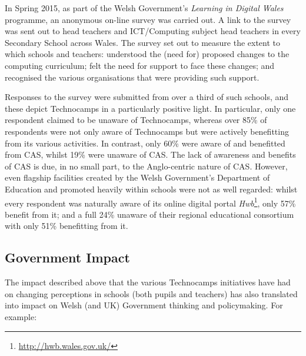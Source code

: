 \documentclass{llncs}
\begin{document}
In Spring 2015, as part of the Welsh Government's
\emph{Learning in Digital Wales} programme,
an anonymous on-line survey was carried out.
A link to the survey %
was sent out to head teachers and ICT/Computing subject head teachers
in every Secondary School across Wales.
The survey set out to measure the extent to which schools and teachers:
understood the (need for) proposed changes to the computing curriculum;
felt the need for support to face these changes;
and recognised the various organisations that were
providing such support.

Responses to the survey were submitted from over a third of such
schools, and these depict Technocamps in a particularly positive
light.  In particular, only one respondent claimed to be unaware of
Technocamps, whereas over 85\% of respondents were not only aware of
Technocamps but were actively benefitting from its various activities.
In contrast, only 60\% were aware of and benefitted from CAS, whilst
19\% were unaware of CAS. The lack of awareness and benefits of CAS is
due, in no small part, to the Anglo-centric nature of CAS.  However,
even flagship facilities created by the Welsh Government's Department
of Education and promoted heavily within schools were not as well
regarded: whilst every respondent was naturally aware of its online
digital portal {\emph{Hwb}}\footnote{\url{http://hwb.wales.gov.uk/}}, only 57\%
benefit from it; and a full 24\% unaware of their regional educational
consortium with only 51\% benefitting from it.

\subsection{Government Impact}
\label{govrecog}

The impact described above that the various Technocamps initiatives
have had on changing perceptions in schools (both pupils and teachers)
has also translated into impact on Welsh (and UK) Government thinking
and policymaking. For example:
\end{document}

